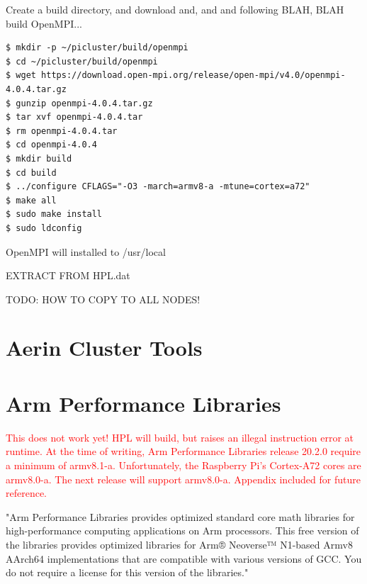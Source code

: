 \documentclass{report}
\begin{document}
Create a build directory, and download and, and and following BLAH, BLAH build OpenMPI...

\lstset{style=termstyle}
\begin{lstlisting}
$ mkdir -p ~/picluster/build/openmpi
$ cd ~/picluster/build/openmpi
$ wget https://download.open-mpi.org/release/open-mpi/v4.0/openmpi-4.0.4.tar.gz
$ gunzip openmpi-4.0.4.tar.gz
$ tar xvf openmpi-4.0.4.tar
$ rm openmpi-4.0.4.tar
$ cd openmpi-4.0.4
$ mkdir build
$ cd build
$ ../configure CFLAGS="-O3 -march=armv8-a -mtune=cortex=a72"
$ make all
$ sudo make install
$ sudo ldconfig
\end{lstlisting}

OpenMPI will installed to /usr/local

EXTRACT FROM HPL.dat


TODO: HOW TO COPY TO ALL NODES!


%
%
\chapter{Aerin Cluster Tools}








%
%

\chapter{Arm Performance Libraries}

\textcolor{red}{This does not work yet! HPL will build, but raises an illegal instruction error at runtime. At the time of writing, Arm Performance Libraries release 20.2.0 require a minimum of armv8.1-a. Unfortunately, the Raspberry Pi's Cortex-A72 cores are armv8.0-a. The next release will support armv8.0-a. Appendix included for future reference.}  

"Arm Performance Libraries provides optimized standard core math libraries for high-performance computing applications on Arm processors. This free version of the libraries provides optimized libraries for Arm® Neoverse™ N1-based Armv8 AArch64 implementations that are compatible with various versions of GCC. You do not require a license for this version of the libraries."
\end{document}
